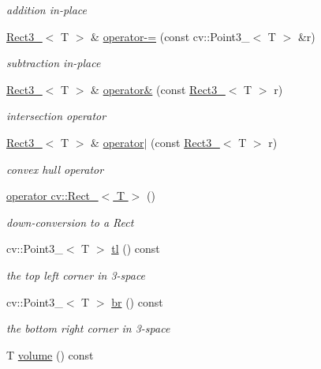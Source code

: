 \begin{DoxyCompactItemize}
\begin{DoxyCompactList}\small\item\em addition in-\/place \end{DoxyCompactList}\item 
\hyperlink{classRect3__}{Rect3\-\_\-}$<$ T $>$ \& \hyperlink{classRect3___a3a626255017a7cef76e065c51ef1504f}{operator-\/=} (const cv\-::\-Point3\-\_\-$<$ T $>$ \&r)
\begin{DoxyCompactList}\small\item\em subtraction in-\/place \end{DoxyCompactList}\item 
\hyperlink{classRect3__}{Rect3\-\_\-}$<$ T $>$ \& \hyperlink{classRect3___a24609371fde6d5c8383dbb210bb75b5e}{operator\&} (const \hyperlink{classRect3__}{Rect3\-\_\-}$<$ T $>$ r)
\begin{DoxyCompactList}\small\item\em intersection operator \end{DoxyCompactList}\item 
\hyperlink{classRect3__}{Rect3\-\_\-}$<$ T $>$ \& \hyperlink{classRect3___a0f988dcf6a9ad19243844abf4acba653}{operator$|$} (const \hyperlink{classRect3__}{Rect3\-\_\-}$<$ T $>$ r)
\begin{DoxyCompactList}\small\item\em convex hull operator \end{DoxyCompactList}\item 
\hyperlink{classRect3___a4f49b82908b88ed545690bfff932ea30}{operator cv\-::\-Rect\-\_\-$<$ T $>$} ()
\begin{DoxyCompactList}\small\item\em down-\/conversion to a Rect \end{DoxyCompactList}\item 
cv\-::\-Point3\-\_\-$<$ T $>$ \hyperlink{classRect3___a8df208aa3d316ea706a529db292d1a0f}{tl} () const 
\begin{DoxyCompactList}\small\item\em the top left corner in 3-\/space \end{DoxyCompactList}\item 
cv\-::\-Point3\-\_\-$<$ T $>$ \hyperlink{classRect3___a253d895d86ec7718351f29ff3cd0cd27}{br} () const 
\begin{DoxyCompactList}\small\item\em the bottom right corner in 3-\/space \end{DoxyCompactList}\item 
T \hyperlink{classRect3___a766842fae2533d47ccf9b7fb428670c8}{volume} () const 

\end{DoxyCompactItemize}
